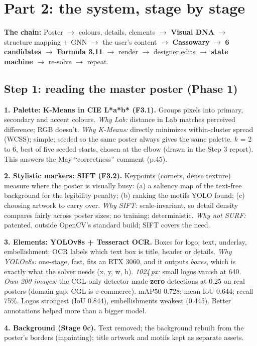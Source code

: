 \documentclass[10pt,a4paper]{article}
\begin{document}
\section{Part 2: the system, stage by stage}

\textbf{The chain:} Poster $\to$ colours, details, elements $\to$ \textbf{Visual DNA} $\to$ structure mapping + GNN $\to$ the user's content $\to$ \textbf{Cassowary} $\to$ \textbf{6 candidates} $\to$ \textbf{Formula 3.11} $\to$ render $\to$ designer edits $\to$ \textbf{state machine} $\to$ re-solve $\to$ repeat.

\subsection*{Step 1: reading the master poster (Phase 1)}
\textbf{1. Palette: K-Means in CIE L*a*b* (F3.1).} Groups pixels into primary, secondary and accent colours. \emph{Why Lab:} distance in Lab matches perceived difference; RGB doesn't. \emph{Why K-Means:} directly minimizes within-cluster spread (WCSS); simple; seeded so the same poster always gives the same palette. $k$ = 2 to 6, best of five seeded starts, chosen at the elbow (drawn in the Step 3 report). This answers the May ``correctness'' comment (p.45).

\textbf{2. Stylistic markers: SIFT (F3.2).} Keypoints (corners, dense texture) measure where the poster is visually busy: (a) a saliency map of the text-free background for the legibility penalty; (b) ranking the motifs YOLO found; (c) choosing artwork to carry over. \emph{Why SIFT:} scale-invariant, so detail density compares fairly across poster sizes; no training; deterministic. \emph{Why not SURF:} patented, outside OpenCV's standard build; SIFT covers the need.

\textbf{3. Elements: YOLOv8s + Tesseract OCR.} Boxes for logo, text, underlay, embellishment; OCR labels which text box is title, header or details. \emph{Why YOLOv8s:} one-stage, fast, fits an RTX 3060, and it outputs \emph{boxes}, which is exactly what the solver needs (x, y, w, h). \emph{1024\,px:} small logos vanish at 640. \emph{Own 200 images:} the CGL-only detector made \textbf{zero} detections at 0.25 on real posters (domain gap: CGL is e-commerce). mAP50 0.728; mean IoU 0.644; recall 75\%. Logos strongest (IoU 0.844), embellishments weakest (0.445). Better annotations helped more than a bigger model.

\textbf{4. Background (Stage 0c).} Text removed; the background rebuilt from the poster's borders (inpainting); title artwork and motifs kept as separate assets.
\end{document}
